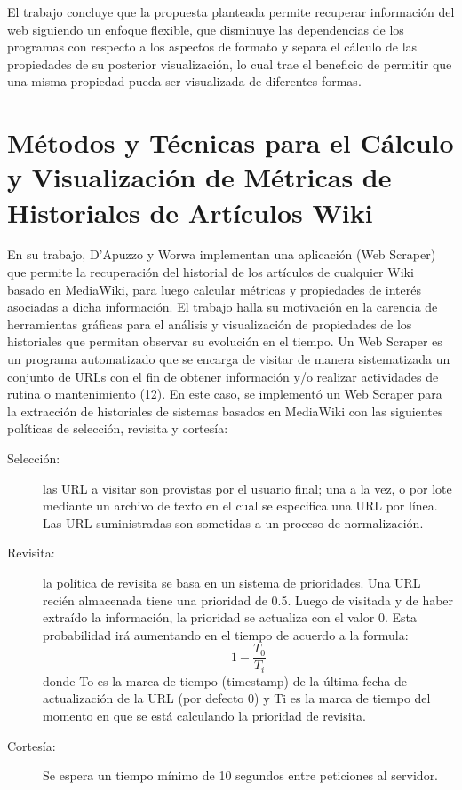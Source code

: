 El trabajo concluye que la propuesta planteada permite recuperar información del web siguiendo un enfoque flexible, que disminuye las dependencias de los programas con respecto a los aspectos de formato y separa el cálculo de las propiedades de su posterior visualización, lo cual trae el beneficio de permitir que una misma propiedad pueda ser visualizada de diferentes formas.

\section{Métodos y Técnicas para el Cálculo y Visualización de Métricas de Historiales de Artículos Wiki} En su trabajo, D’Apuzzo y Worwa implementan una aplicación (Web Scraper) que permite la recuperación del historial de los artículos de cualquier Wiki basado en MediaWiki, para luego calcular métricas y propiedades de interés asociadas a dicha información. El trabajo halla su motivación en la carencia de herramientas gráficas para el análisis y visualización de propiedades de los historiales que permitan observar su evolución en el tiempo.  Un Web Scraper es un programa automatizado que se encarga de visitar de manera sistematizada un conjunto de URLs con el fin de obtener información y/o realizar actividades de rutina o mantenimiento (12). En este caso, se implementó un Web Scraper para la extracción de historiales de sistemas basados en MediaWiki con las siguientes políticas de selección, revisita y cortesía:

\begin{description}
  \item[Selección:] las URL a visitar son provistas por el usuario final; una a la vez, o por lote mediante un archivo de texto en el cual se especifica una URL por línea. Las URL suministradas son sometidas a un proceso de normalización.
  \item[Revisita:] la política de revisita se basa en un sistema de prioridades. Una URL recién almacenada tiene una prioridad de 0.5. Luego de visitada y de haber extraído la información, la prioridad se actualiza con el valor 0. Esta probabilidad irá aumentando en el tiempo de acuerdo a la formula:
\begin{equation}
  1-\frac{T_{0}}{T_{i}}
\end{equation}
donde To es la marca de tiempo (timestamp) de la última fecha de actualización de la URL (por defecto 0) y Ti es la marca de tiempo del momento en que se está calculando la prioridad de revisita.
  \item[Cortesía:] Se espera un tiempo mínimo de 10 segundos entre peticiones al servidor.
\end{description}

